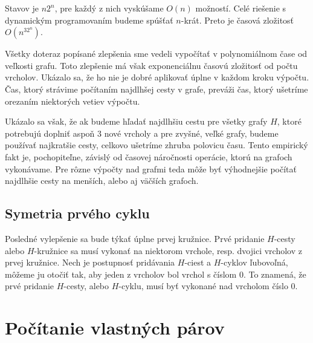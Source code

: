 Stavov je $n2^n$, pre každý z nich vyskúšame $O(n)$ možností. Celé riešenie s dynamickým
programovaním budeme spúšťať $n$-krát. Preto je časová zložitosť $O(n^32^n)$.

Všetky doteraz popísané zlepšenia sme vedeli vypočítať v polynomiálnom čase od veľkosti grafu.
Toto zlepšenie má však exponenciálnu časovú zložitosť od počtu vrcholov. Ukázalo sa,
že ho nie je dobré aplikovať úplne v každom kroku výpočtu. Čas, ktorý strávime počítaním
najdlhšej cesty v grafe, preváži čas, ktorý ušetríme orezaním niektorých vetiev výpočtu.

Ukázalo sa však, že ak budeme hľadať najdlhšiu cestu pre všetky grafy $H$, ktoré potrebujú
doplniť aspoň $3$ nové vrcholy a pre zvyšné, veľké grafy, budeme používať najkratšie cesty,
celkovo ušetríme zhruba polovicu času. Tento empirický fakt je, pochopiteľne, závislý od
časovej náročnosti operácie, ktorú na grafoch vykonávame. Pre rôzne výpočty nad grafmi
teda môže byť výhodnejšie počítať najdlhšie cesty na menších, alebo aj väčších grafoch.

\subsection{Symetria prvého cyklu}

Posledné vylepšenie sa bude týkať úplne prvej kružnice. Prvé pridanie $H$-cesty alebo $H$-kružnice
sa musí vykonať na niektorom vrchole, resp. dvojici vrcholov z prvej kružnice.
Nech je postupnosť pridávania $H$-ciest a $H$-cyklov ľubovoľná, môžeme ju otočiť tak, aby jeden
z vrcholov bol vrchol s číslom $0$. To znamená, že prvé pridanie $H$-cesty, alebo $H$-cyklu,
musí byť vykonané nad vrcholom číslo $0$.

\section{Počítanie vlastných párov}
